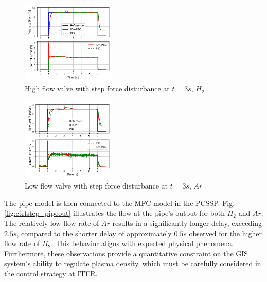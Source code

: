 \documentclass[letterpaper, 10pt, conference]{ieeeconf}
\begin{document}
\begin{figure}[!ht]
    \centering
    \includegraphics[width=0.4\textwidth]{flow_dist_H2.pdf}
    \caption{High flow valve with step force disturbance at $t=3s$, $H_2$}
    \label{fig:ctrldist_H2}
\end{figure}
\begin{figure}[!ht]
    \centering
    \includegraphics[width=0.4\textwidth]{flow_dist_Ar.pdf}
    \caption{Low flow valve with step force disturbance at $t=3s$, $Ar$}
    \label{fig:ctrldist_Ar}
\end{figure}

The pipe model is then connected to the MFC model in the PCSSP. Fig. \ref{fig:ctrlstep_pipeout} illustrates the flow at the pipe's output for both $H_2$ and $Ar$. The relatively low flow rate of $Ar$ results in a significantly longer delay, exceeding $2.5s$, compared to the shorter delay of approximately $0.5s$ observed for the higher flow rate of $H_2$. This behavior aligns with expected physical phenomena. Furthermore, these observations provide a quantitative constraint on the GIS system's ability to regulate plasma density, which must be carefully considered in the control strategy at ITER.
\end{document}
